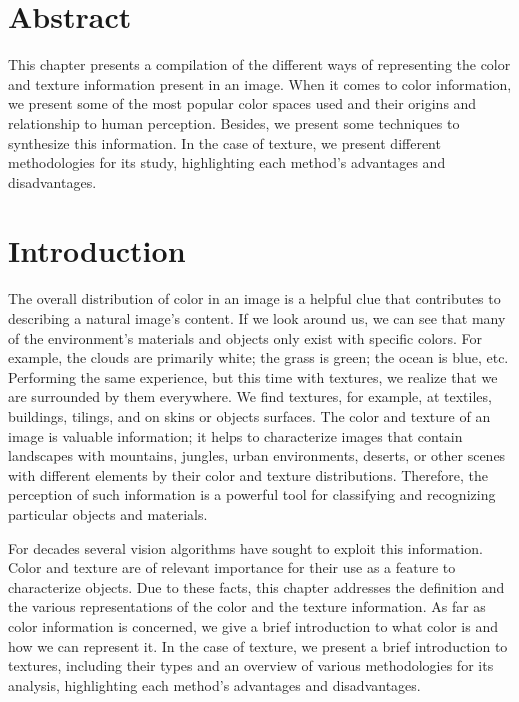 \section*{Abstract}
\noindent 
This chapter presents a compilation of the different ways of representing the color and texture information present in an image. When it comes to color information, we present some of the most popular color spaces used and their origins and relationship to human perception. Besides, we present some techniques to synthesize this information. In the case of texture, we present different methodologies for its study, highlighting each method's advantages and disadvantages.

\section{Introduction}

The overall distribution of color in an image is a helpful clue that contributes to describing a natural image's content. If we look around us, we can see that many of the environment's materials and objects only exist with specific colors. For example, the clouds are primarily white; the grass is green; the ocean is blue, etc. Performing the same experience, but this time with textures, we realize that we are surrounded by them everywhere. We find textures, for example, at textiles, buildings, tilings, and on skins or objects surfaces. The color and texture of an image is valuable information; it helps to characterize images that contain landscapes with mountains, jungles, urban environments, deserts, or other scenes with different elements by their color and texture distributions. Therefore, the perception of such information is a powerful tool for classifying and recognizing particular objects and materials.

For decades several vision algorithms have sought to exploit this information. Color and texture are of relevant importance for their use as a feature to characterize objects. Due to these facts, this chapter addresses the definition and the various representations of the color and the texture information. As far as color information is concerned, we give a brief introduction to what color is and how we can represent it. In the case of texture, we present a brief introduction to textures, including their types and an overview of various methodologies for its analysis, highlighting each method's advantages and disadvantages. 


